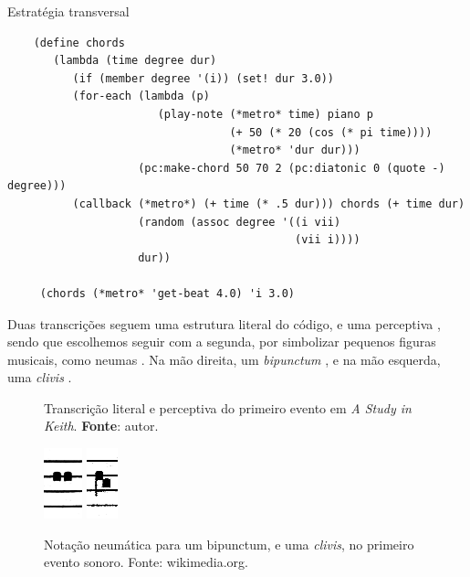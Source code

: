 \begin{example}{Estratégia transversal}
\begin{verbatim}
    (define chords
       (lambda (time degree dur)
          (if (member degree '(i)) (set! dur 3.0))
          (for-each (lambda (p)
                       (play-note (*metro* time) piano p
                                  (+ 50 (* 20 (cos (* pi time))))
                                  (*metro* 'dur dur)))
                    (pc:make-chord 50 70 2 (pc:diatonic 0 (quote -) degree)))
          (callback (*metro*) (+ time (* .5 dur))) chords (+ time dur)
                    (random (assoc degree '((i vii)
                                            (vii i))))
                    dur))
    
     (chords (*metro* 'get-beat 4.0) 'i 3.0)
\end{verbatim}
\end{example}

Duas transcrições seguem uma estrutura literal do código, e uma perceptiva , sendo que escolhemos seguir com a segunda, por simbolizar pequenos figuras musicais, como neumas . Na mão direita, um \emph{bipunctum} , e na mão esquerda, uma \emph{clivis} . 

\begin{figure}[!h]
  \centering
  
  
  \caption{Transcrição literal e perceptiva do primeiro evento em \emph{A Study in Keith}. \textbf{Fonte}: autor.}
  \label{fig:ask1}
\end{figure}


\begin{figure}[!h]
  \centering
  \includegraphics[scale=1]{imagens/bipunctum.png}
  \includegraphics[scale=1]{imagens/clivis.png}
  \caption{Notação neumática para um bipunctum, e uma \emph{clivis}, no primeiro evento sonoro. Fonte: wikimedia.org.}
  \label{fig:bipunctum}
\end{figure}

